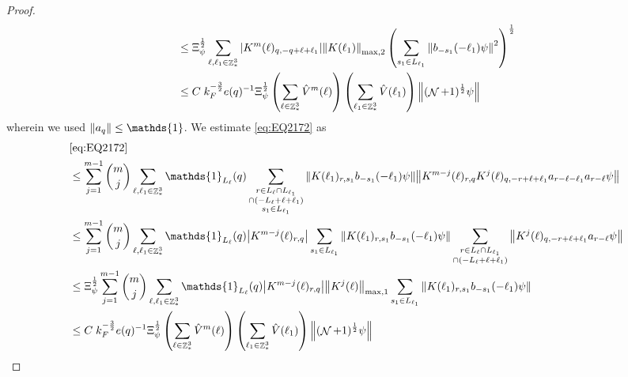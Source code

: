 \documentclass[sn-mathphys, Numbered ,a4paper]{sn-jnl}%
\DeclareMathOperator{\Z}{\mathbb{Z}}
\DeclareMathOperator{\NN}{\mathcal{N}}
\newcommand{\half}{\frac{1}{2}}
\theoremstyle{plain}
\theoremstyle{definition}
\theoremstyle{remark}
\theoremstyle{plain}
\theoremstyle{definition}
\theoremstyle{remark}
\begin{document}
\begin{proof}
\begin{align}
	&\leq \Xi_{\psi}^\half \sum\limits_{\ell, \ell_1\in \Z^3_*}  \abs{K^m(\ell)_{q,-q+\ell+\ell_1}} \norm{K(\ell_1)}_{\mathrm{max,2}} \left(\sum\limits_{s_1 \in L_{\ell_1}} \norm{ b_{-s_1}(-\ell_1) \psi}^2\right)^\half\nonumber\\
	&\leq  C\; k_F^{-\frac{3}{2}} e(q)^{-1}\Xi_{\psi}^\half \left(\sum\limits_{\ell \in \Z^3_*} \hat{V}^{m}(\ell)\right)\left( \sum\limits_{\ell_1\in \Z^3_*} \hat{V}(\ell_1) \right) \norm{ (\NN+1)^\half \psi }\label{eq:estEQ2171}
\end{align}
wherein we used $\norm{a_q} \leq \mathds{1}$.
We estimate \eqref{eq:EQ2172} as
\begin{align}
	&\eqref{eq:EQ2172}\nonumber\\
	&\leq\sum\limits_{j=1}^{m-1} {{m}\choose j} \sum\limits_{\ell, \ell_1\in \Z^3_*}\mathds{1}_{L_{\ell}}(q) \sum\limits_{\substack{r\in L_{\ell} \cap L_{\ell_1} \\ \cap (-L_{\ell}+\ell+\ell_1)\\s_1\in L_{\ell_1}}}  \norm{K(\ell_1)_{r,s_1} b_{-s_1}(-\ell_1) \psi}\norm{ K^{m-j}(\ell)_{r,q} K^j(\ell)_{q,-r+\ell+\ell_1} a_{r-\ell-\ell_1} a_{r-\ell} \psi }\nonumber\\
	&\leq\sum\limits_{j=1}^{m-1} {{m}\choose j} \sum\limits_{\ell, \ell_1\in \Z^3_*}\mathds{1}_{L_{\ell}}(q) \abs{K^{m-j}(\ell)_{r,q}} \sum\limits_{s_1\in L_{\ell_1}} \norm{K(\ell_1)_{r,s_1} b_{-s_1}(-\ell_1) \psi} \sum\limits_{\substack{r\in L_{\ell} \cap L_{\ell_1} \\ \cap (-L_{\ell}+\ell+\ell_1)}}  \norm{  K^j(\ell)_{q,-r+\ell+\ell_1} a_{r-\ell} \psi }\nonumber\\
	&\leq \Xi_{\psi}^\half \sum\limits_{j=1}^{m-1} {{m}\choose j} \sum\limits_{\ell, \ell_1\in \Z^3_*}\mathds{1}_{L_{\ell}}(q)  \abs{K^{m-j}(\ell)_{r,q}} \norm{K^{j}(\ell)}_{\mathrm{max,1}}  \sum\limits_{s_1\in L_{\ell_1}} \norm{K(\ell_1)_{r,s_1} b_{-s_1}(-\ell_1) \psi} \nonumber\\
	&\leq   C\; k_F^{-\frac{3}{2}} e(q)^{-1}\Xi_{\psi}^\half \left(\sum\limits_{\ell \in \Z^3_*} \hat{V}^{m}(\ell)\right)\left( \sum\limits_{\ell_1\in \Z^3_*} \hat{V}(\ell_1) \right) \norm{ (\NN+1)^\half \psi } \label{eq:estEQ2172}
\end{align}


\end{proof}
\end{document}
